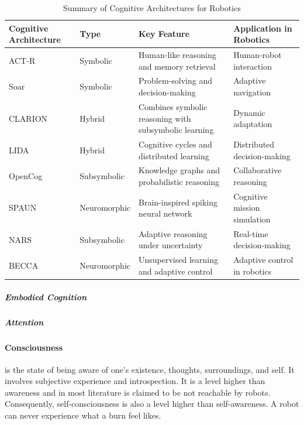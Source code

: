 \documentclass{book}
\begin{document}
            \begin{table}[h!]
                \centering
                \begin{tabular}{|l|l|l|l|}
                    \hline
                    \textbf{Cognitive Architecture} & \textbf{Type} & \textbf{Key Feature} & \textbf{Application in Robotics} \\ \hline
                    ACT-R & Symbolic & Human-like reasoning and memory retrieval & Human-robot interaction  \\ \hline
                    Soar & Symbolic & Problem-solving and decision-making & Adaptive navigation  \\ \hline
                    CLARION & Hybrid & Combines symbolic reasoning with subsymbolic learning & Dynamic adaptation  \\ \hline
                    LIDA & Hybrid & Cognitive cycles and distributed learning & Distributed decision-making  \\ \hline
                    OpenCog & Subsymbolic & Knowledge graphs and probabilistic reasoning & Collaborative reasoning  \\ \hline
                    SPAUN & Neuromorphic & Brain-inspired spiking neural network & Cognitive mission simulation  \\ \hline
                    NARS & Subsymbolic & Adaptive reasoning under uncertainty & Real-time decision-making  \\ \hline
                    BECCA & Neuromorphic & Unsupervised learning and adaptive control & Adaptive control in robotics  \\ \hline
                \end{tabular}
                \caption{Summary of Cognitive Architectures for Robotics}
            \end{table}




    \subparagraph{Embodied Cognition}

    \subparagraph{Attention}



\paragraph{Consciousness} is the state of being aware of one’s existence, thoughts, surroundings, and self. It involves subjective experience and introspection. It is a level higher than awareness and in most literature is claimed to be not reachable by robots. Consequently, self-consciousness is also a level higher than self-awareness. A robot can never experience what a burn feel likes.
\end{document}

